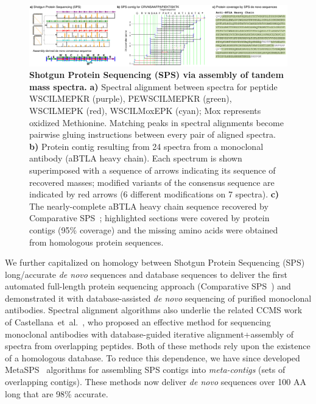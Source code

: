\documentclass[arial,11pt]{article}
\begin{document}
\begin{figure}[htb!]
\centering
\includegraphics[width=\textwidth]{figures/figSPS.pdf}

  \caption{\footnotesize{\bf Shotgun Protein Sequencing (SPS) via assembly of tandem mass spectra.} \textbf{a)} Spectral alignment between spectra for peptide WSCILMEPKR (purple), PEWSCILMEPKR (green), WSCILMEPK (red), WSCILMoxEPK (cyan); Mox represents oxidized Methionine. Matching peaks in spectral alignments become pairwise gluing instructions between every pair of aligned spectra. \textbf{b)} Protein contig resulting from 24 spectra from a monoclonal antibody (aBTLA heavy chain). Each spectrum is shown superimposed with a sequence of arrows indicating its sequence of recovered masses; modified variants of the consensus sequence are indicated by red arrows (6 different modifications on 7 spectra). \textbf{c)} The nearly-complete aBTLA heavy chain sequence recovered by Comparative SPS~\cite{bandeira08}; highlighted sections were covered by protein contigs (95\% coverage) and the missing amino acids were obtained from homologous protein sequences.}
  \label{trd.snets.fig.sps}
\end{figure}

We further capitalized on homology between Shotgun Protein Sequencing (SPS) long/accurate {\em de novo} sequences and database sequences to deliver the first automated full-length protein sequencing approach (Comparative SPS~\cite{bandeira08}) and demonstrated it with database-assisted {\em de novo} sequencing of purified monoclonal antibodies. Spectral alignment algorithms also underlie the related CCMS work of Castellana~et~al.~\cite{castellana10,castellana11}, who proposed an effective method for sequencing monoclonal antibodies with database-guided iterative alignment+assembly of spectra from overlapping peptides. Both of these methods rely upon the existence of a homologous database. To reduce this dependence, we have since developed MetaSPS~\cite{guthals12metasps} algorithms for assembling SPS contigs into {\em meta-contigs} (sets of overlapping contigs). These methods now deliver {\em de novo} sequences over 100 AA long
that are 98\% accurate.
\end{document}
